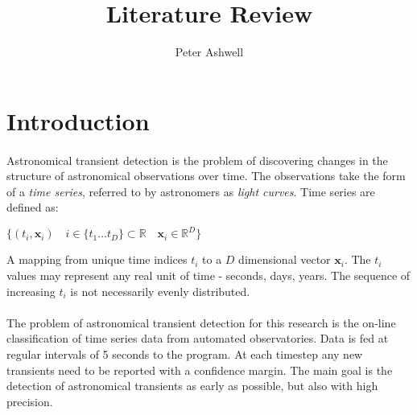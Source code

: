 \documentclass[11pt]{article}
\title{Literature Review}
\author{Peter Ashwell}
\date{}
\begin{document}
	\maketitle
	\section{Introduction}
	\paragraph{}
	Astronomical transient detection is the problem of discovering changes in the structure of astronomical observations over time. The observations take the form of a \emph{time series}, referred to by astronomers as \emph{light curves}. Time series are defined as:
	\begin{center}
	\begin{math}
		\{(t_i, \mathbf{x}_{i}) \quad i \in \{t_{1} \ldots t_{D}\} \subset \mathbb{R} \quad \mathbf{x}_{i} \in \mathbb{R}^{D} \}
	\end{math}
	\end{center}
	A mapping from unique time indices $t_{i}$ to a $D$ dimensional vector $\mathbf{x}_{i}$. The $t_{i}$ values may represent any real unit of time - seconds, days, years. The sequence of increasing $t_{i}$ is not necessarily evenly distributed.
	\paragraph{}
	The problem of astronomical transient detection for this research is the on-line classification of time series data from automated observatories. Data is fed at regular intervals of 5 seconds to the program. At each timestep any new transients need to be reported with a confidence margin. The main goal is the detection of astronomical transients as early as possible, but also with high precision.
\end{document}
